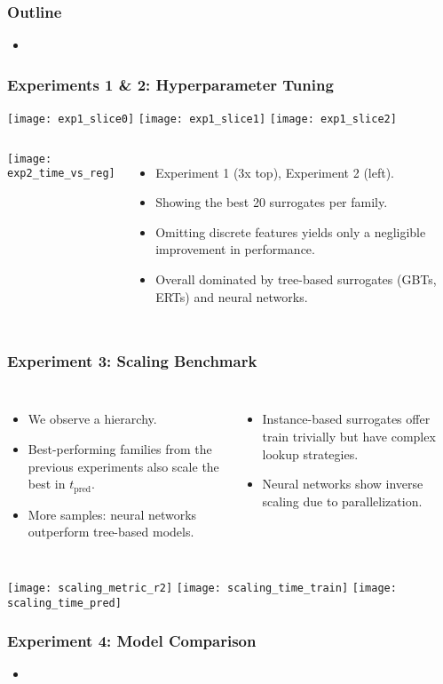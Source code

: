 \begin{frame}
	\frametitle{Outline}
	\begin{itemize}
		\item %
	\end{itemize}
\end{frame}

\begin{frame}
	\frametitle{Experiments 1 \& 2: Hyperparameter Tuning}

	\texttt{[image: exp1\_slice0]}\hfill%
	\texttt{[image: exp1\_slice1]}\hfill%
	\texttt{[image: exp1\_slice2]}

	\begin{columns}
		\texttt{[image: exp2\_time\_vs\_reg]}

		\begin{itemize}
			\item
				Experiment 1 (3x top), Experiment 2 (left).
			\item
				Showing the best 20 surrogates per family.
			\item
				Omitting discrete features yields only a negligible
				improvement in performance.
			\item
				Overall dominated by tree-based surrogates (GBTs, ERTs) and
				neural networks.
		\end{itemize}
	\end{columns}

\end{frame}

\begin{frame}
	\frametitle{Experiment 3: Scaling Benchmark}
	\begin{columns}
		\column{0.5\textwidth}
		\begin{itemize}
			\item
				We observe a hierarchy.
			\item
				Best-performing families from the previous experiments also scale the
				best in $t_\text{pred}$.
			\item
				More samples: neural networks outperform tree-based models.
		\end{itemize}

		\column{0.5\textwidth}
		\begin{itemize}
			\item
				Instance-based surrogates offer train trivially but have
				complex lookup strategies.
			\item
				Neural networks show inverse scaling due to
				parallelization.
		\end{itemize}
	\end{columns}

	\vspace{1em}

	\texttt{[image: scaling\_metric\_r2]}
	\texttt{[image: scaling\_time\_train]}
	\texttt{[image: scaling\_time\_pred]}
\end{frame}

\begin{frame}
	\frametitle{Experiment 4: Model Comparison}
	\begin{itemize}
		\item %
	\end{itemize}
\end{frame}
